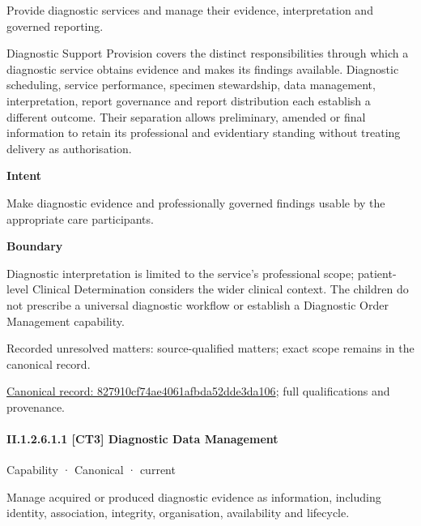 Provide diagnostic services and manage their evidence, interpretation and governed reporting.



Diagnostic Support Provision covers the distinct responsibilities through which a diagnostic service obtains evidence and makes its findings available. Diagnostic scheduling, service performance, specimen stewardship, data management, interpretation, report governance and report distribution each establish a different outcome. Their separation allows preliminary, amended or final information to retain its professional and evidentiary standing without treating delivery as authorisation.



\textbf{Intent}



Make diagnostic evidence and professionally governed findings usable by the appropriate care participants.



\textbf{Boundary}



Diagnostic interpretation is limited to the service's professional scope; patient-level Clinical Determination considers the wider clinical context. The children do not prescribe a universal diagnostic workflow or establish a Diagnostic Order Management capability.


{\small Recorded unresolved matters: source-qualified matters; exact scope remains in the canonical record.}\par
{\footnotesize \href{../../../../continuum/strategy/capability/827910cf74ae4061afbda52dde3da106.md}{Canonical record: 827910cf74ae4061afbda52dde3da106}; full qualifications and provenance.}\par
\paragraph*{II.1.2.6.1.1 [CT3] Diagnostic Data Management}
\label{navigation:II.1.2.6.1.1}

\label{element:aeb8e6d2225a4df38e61ae116850b32c}
{\small Capability · Canonical · current}\par

Manage acquired or produced diagnostic evidence as information, including identity, association, integrity, organisation, availability and lifecycle.



